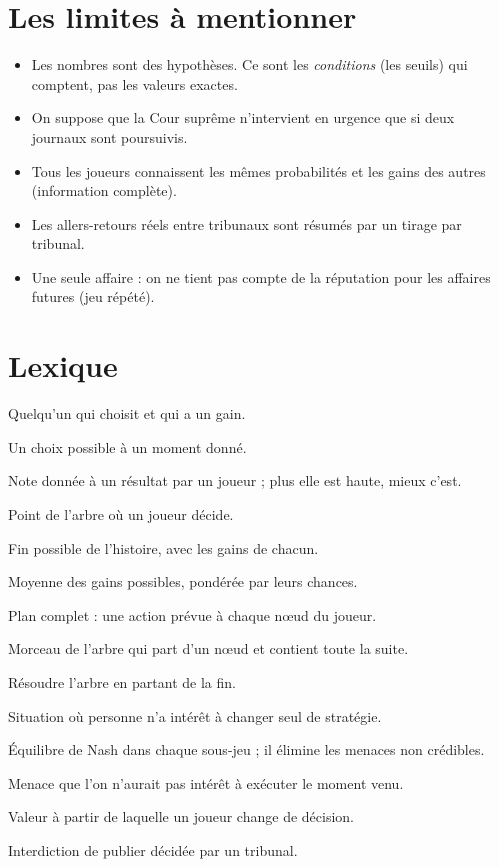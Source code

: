 \documentclass[11pt,a4paper]{article}
\theoremstyle{definition}
\begin{document}
\section{Les limites à mentionner}
\begin{itemize}[leftmargin=*,itemsep=1pt]
\item Les nombres sont des hypothèses. Ce sont les \emph{conditions} (les seuils) qui comptent, pas les valeurs exactes.
\item On suppose que la Cour suprême n'intervient en urgence que si deux journaux sont poursuivis.
\item Tous les joueurs connaissent les mêmes probabilités et les gains des autres (information complète).
\item Les allers-retours réels entre tribunaux sont résumés par un tirage par tribunal.
\item Une seule affaire : on ne tient pas compte de la réputation pour les affaires futures (jeu répété).
\end{itemize}

\section{Lexique}
\begin{description}[leftmargin=!,labelwidth=3.4cm,itemsep=1pt,font=\normalfont\bfseries]
\item[Joueur] Quelqu'un qui choisit et qui a un gain.
\item[Action] Un choix possible à un moment donné.
\item[Gain] Note donnée à un résultat par un joueur ; plus elle est haute, mieux c'est.
\item[Nœud] Point de l'arbre où un joueur décide.
\item[Feuille (issue)] Fin possible de l'histoire, avec les gains de chacun.
\item[Gain espéré] Moyenne des gains possibles, pondérée par leurs chances.
\item[Stratégie] Plan complet : une action prévue à chaque nœud du joueur.
\item[Sous-jeu] Morceau de l'arbre qui part d'un nœud et contient toute la suite.
\item[Induction à rebours] Résoudre l'arbre en partant de la fin.
\item[Équilibre de Nash] Situation où personne n'a intérêt à changer seul de stratégie.
\item[ENPS] Équilibre de Nash dans chaque sous-jeu ; il élimine les menaces non crédibles.
\item[Menace non crédible] Menace que l'on n'aurait pas intérêt à exécuter le moment venu.
\item[Seuil] Valeur à partir de laquelle un joueur change de décision.
\item[Censure] Interdiction de publier décidée par un tribunal.
\end{description}
\end{document}
